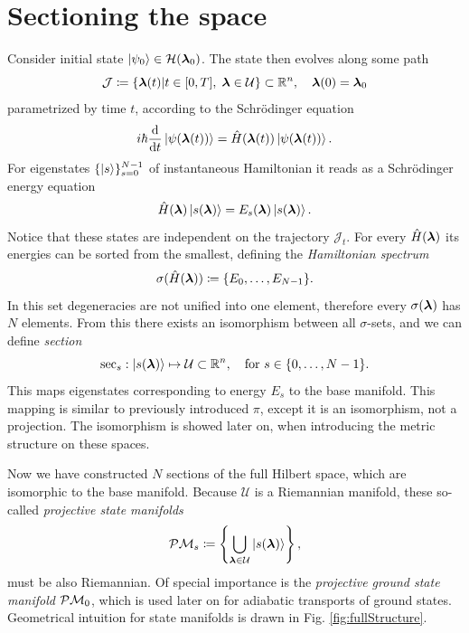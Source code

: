 \section{Sectioning the space}
Consider initial state $\ket{\psi_0}\in \mathcal{H}({\bm\lambda}_0)$. The state then evolves along some path 
\begin{equation}
    \mathcal J\coloneqq\{{\bm\lambda}(t)|t\in[0,T],\; {\bm\lambda}\in \mathcal U\} \subset \mathbb{R}^n,\quad {\bm\lambda}(0)={\bm\lambda}_0
    \label{eq:defJ}    
\end{equation}
parametrized by time $t$, according to the Schr\"odinger equation
\begin{equation}
    i\hbar \frac{\mathrm{d} }{\mathrm{d} t}\ket{\psi({\bm\lambda}(t))} = \hat{H}({\bm\lambda}(t))\ket{\psi({\bm\lambda}(t))}.
    \label{eq:schrodinger}
\end{equation}
For eigenstates $\{\ket{s}\}_{s=0}^{N-1}$ of instantaneous Hamiltonian it reads as a Schr\"odinger energy equation
\begin{equation}
    \hat{H}({\bm\lambda})\ket{s({\bm\lambda})}=E_s({\bm\lambda})\ket{s({\bm\lambda})}.
    \label{eq:energySchrodinger}
\end{equation}
Notice that these states are independent on the trajectory $\mathcal J_t$.
For every $\hat{H}({\bm\lambda})$ its energies can be sorted from the smallest, defining the \emph{Hamiltonian spectrum}
\begin{equation}
    \sigma(\hat{H}({\bm\lambda}))\coloneqq\{E_0,\dots,E_{N-1}\}.
\end{equation}
In this set degeneracies are not unified into one element, therefore every $\sigma({\bm\lambda})$ has $N$ elements. From this there exists an isomorphism between all $\sigma$-sets, and we can define \emph{section} 
$$\mathrm{sec}_s: \ket{s({\bm\lambda})}\mapsto \mathcal{U}\subset \mathbb{R}^n, \quad \text{for } s\in\{0,\dots, N-1\}.$$
This maps eigenstates corresponding to energy $E_s$ to the base manifold. This mapping is similar to previously introduced $\pi$, except it is an isomorphism, not a projection. The isomorphism is showed later on, when introducing the metric structure on these spaces.

Now we have constructed $N$ sections of the full Hilbert space, which are isomorphic to the base manifold. Because $\mathcal U$ is a Riemannian manifold, these so-called \emph{projective state manifolds} 
\begin{equation}
    \mathcal{P}\mathcal{M}_s\coloneqq \left\{\bigcup_{{\bm\lambda}\in\mathcal U} \ket{s({\bm\lambda})}\right\},
\end{equation}
must be also Riemannian.
Of special importance is the \emph{projective ground state manifold} $\mathcal{P}\mathcal{M}_0$, which is used later on for adiabatic transports of ground states. Geometrical intuition for  state manifolds is drawn in Fig. \ref{fig:fullStructure}. 

